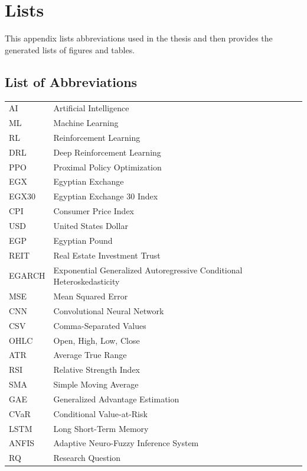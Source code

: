 \appendix
\renewcommand{\appendixtocname}{Appendix}
\renewcommand{\appendixpagename}{\appendixtocname}
\addappheadtotoc
{}
\appendixpage

\chapter{Lists}
This appendix lists abbreviations used in the thesis and then provides the generated lists of figures and tables.

\section*{List of Abbreviations}
{}
\begin{tabular}{ll}
AI & Artificial Intelligence \\
ML & Machine Learning \\
RL & Reinforcement Learning \\
DRL & Deep Reinforcement Learning \\
PPO & Proximal Policy Optimization \\
EGX & Egyptian Exchange \\
EGX30 & Egyptian Exchange 30 Index \\
CPI & Consumer Price Index \\
USD & United States Dollar \\
EGP & Egyptian Pound \\
REIT & Real Estate Investment Trust \\
EGARCH & Exponential Generalized Autoregressive Conditional Heteroskedasticity \\
MSE & Mean Squared Error \\
CNN & Convolutional Neural Network \\
CSV & Comma-Separated Values \\
OHLC & Open, High, Low, Close \\
ATR & Average True Range \\
RSI & Relative Strength Index \\
SMA & Simple Moving Average \\
GAE & Generalized Advantage Estimation \\
CVaR & Conditional Value-at-Risk \\
LSTM & Long Short-Term Memory \\
ANFIS & Adaptive Neuro-Fuzzy Inference System \\
RQ & Research Question \\
\end{tabular}
\clearpage
{}
{}
\listoffigures
\clearpage
{}
{}
\listoftables
